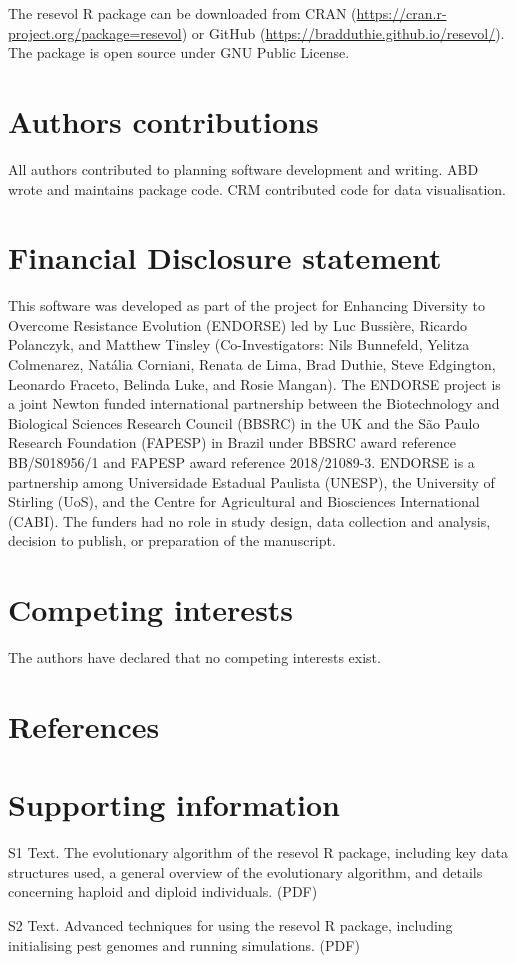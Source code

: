 \documentclass[
]{article}
\begin{document}
The resevol R package can be downloaded from CRAN (\url{https://cran.r-project.org/package=resevol}) or GitHub (\url{https://bradduthie.github.io/resevol/}).
The package is open source under GNU Public License.

\hypertarget{contributions}{%
\section{Authors contributions}\label{contributions}}

All authors contributed to planning software development and writing.
ABD wrote and maintains package code.
CRM contributed code for data visualisation.

\hypertarget{financial}{%
\section{Financial Disclosure statement}\label{financial}}

This software was developed as part of the project for Enhancing Diversity to Overcome Resistance Evolution (ENDORSE) led by Luc Bussière, Ricardo Polanczyk, and Matthew Tinsley (Co-Investigators: Nils Bunnefeld, Yelitza Colmenarez, Natália Corniani, Renata de Lima, Brad Duthie, Steve Edgington, Leonardo Fraceto, Belinda Luke, and Rosie Mangan).
The ENDORSE project is a joint Newton funded international partnership between the Biotechnology and Biological Sciences Research Council (BBSRC) in the UK and the São Paulo Research Foundation (FAPESP) in Brazil under BBSRC award reference BB/S018956/1 and FAPESP award reference 2018/21089-3.
ENDORSE is a partnership among Universidade Estadual Paulista (UNESP), the University of Stirling (UoS), and the Centre for Agricultural and Biosciences International (CABI).
The funders had no role in study design, data collection and analysis, decision to publish, or preparation of the manuscript.

\hypertarget{competing}{%
\section{Competing interests}\label{competing}}

The authors have declared that no competing interests exist.

\hypertarget{references}{%
\section{References}\label{references}}

\hypertarget{SI}{%
\section{Supporting information}\label{SI}}

S1 Text. The evolutionary algorithm of the resevol R package, including key data structures used, a general overview of the evolutionary algorithm, and details concerning haploid and diploid individuals. (PDF)

S2 Text. Advanced techniques for using the resevol R package, including initialising pest genomes and running simulations. (PDF)

  
\end{document}
